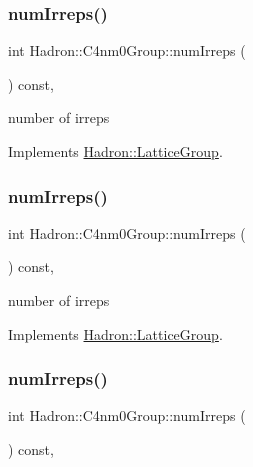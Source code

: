 \subsubsection{\texorpdfstring{numIrreps()}{numIrreps()}\hspace{0.1cm}{\footnotesize\ttfamily [1/3]}}
{\footnotesize\ttfamily int Hadron\+::\+C4nm0\+Group\+::num\+Irreps (\begin{DoxyParamCaption}{ }\end{DoxyParamCaption}) const\hspace{0.3cm}{\ttfamily [inline]}, {\ttfamily [virtual]}}

number of irreps 

Implements \mbox{\hyperlink{structHadron_1_1LatticeGroup_a3edaca488144b5d2a9cf73fe653add34}{Hadron\+::\+Lattice\+Group}}.

\mbox{\label{structHadron_1_1C4nm0Group_ac77e1943ad8fa5f9211d31dc34ee3f6c}} 
\subsubsection{\texorpdfstring{numIrreps()}{numIrreps()}\hspace{0.1cm}{\footnotesize\ttfamily [2/3]}}
{\footnotesize\ttfamily int Hadron\+::\+C4nm0\+Group\+::num\+Irreps (\begin{DoxyParamCaption}{ }\end{DoxyParamCaption}) const\hspace{0.3cm}{\ttfamily [inline]}, {\ttfamily [virtual]}}

number of irreps 

Implements \mbox{\hyperlink{structHadron_1_1LatticeGroup_a3edaca488144b5d2a9cf73fe653add34}{Hadron\+::\+Lattice\+Group}}.

\mbox{\label{structHadron_1_1C4nm0Group_ac77e1943ad8fa5f9211d31dc34ee3f6c}} 
\subsubsection{\texorpdfstring{numIrreps()}{numIrreps()}\hspace{0.1cm}{\footnotesize\ttfamily [3/3]}}
{\footnotesize\ttfamily int Hadron\+::\+C4nm0\+Group\+::num\+Irreps (\begin{DoxyParamCaption}{ }\end{DoxyParamCaption}) const\hspace{0.3cm}{\ttfamily [inline]}, {\ttfamily [virtual]}}


